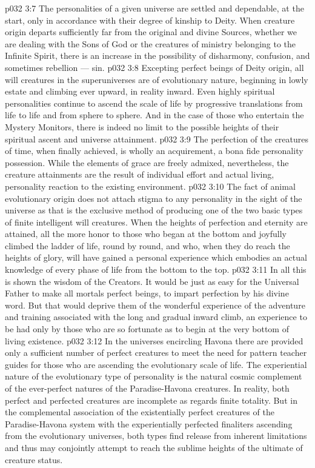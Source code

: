 \vs p032 3:7 \pc The personalities of a given universe are settled and dependable, at the start, only in accordance with their degree of kinship to Deity. When creature origin departs sufficiently far from the original and divine Sources, whether we are dealing with the Sons of God or the creatures of ministry belonging to the Infinite Spirit, there is an increase in the possibility of disharmony, confusion, and sometimes rebellion --- sin.
\vs p032 3:8 \pc Excepting perfect beings of Deity origin, all will creatures in the superuniverses are of evolutionary nature, beginning in lowly estate and climbing ever upward, in reality inward. Even highly spiritual personalities continue to ascend the scale of life by progressive translations from life to life and from sphere to sphere. And in the case of those who entertain the Mystery Monitors, there is indeed no limit to the possible heights of their spiritual ascent and universe attainment.
\vs p032 3:9 The perfection of the creatures of time, when finally achieved, is wholly an acquirement, a bona fide personality possession. While the elements of grace are freely admixed, nevertheless, the creature attainments are the result of individual effort and actual living, personality reaction to the existing environment.
\vs p032 3:10 The fact of animal evolutionary origin does not attach stigma to any personality in the sight of the universe as that is the exclusive method of producing one of the two basic types of finite intelligent will creatures. When the heights of perfection and eternity are attained, all the more honor to those who began at the bottom and joyfully climbed the ladder of life, round by round, and who, when they do reach the heights of glory, will have gained a personal experience which embodies an actual knowledge of every phase of life from the bottom to the top.
\vs p032 3:11 In all this is shown the wisdom of the Creators. It would be just as easy for the Universal Father to make all mortals perfect beings, to impart perfection by his divine word. But that would deprive them of the wonderful experience of the adventure and training associated with the long and gradual inward climb, an experience to be had only by those who are so fortunate as to begin at the very bottom of living existence.
\vs p032 3:12 In the universes encircling Havona there are provided only a sufficient number of perfect creatures to meet the need for pattern teacher guides for those who are ascending the evolutionary scale of life. The experiential nature of the evolutionary type of personality is the natural cosmic complement of the ever\hyp{}perfect natures of the Paradise\hyp{}Havona creatures. In reality, both perfect and perfected creatures are incomplete as regards finite totality. But in the complemental association of the existentially perfect creatures of the Paradise\hyp{}Havona system with the experientially perfected finaliters ascending from the evolutionary universes, both types find release from inherent limitations and thus may conjointly attempt to reach the sublime heights of the ultimate of creature status.

